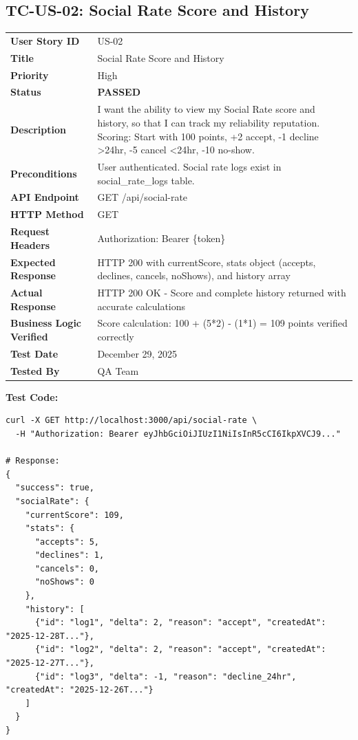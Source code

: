 \documentclass[11pt,a4paper]{article}
\newcommand{\passed}{\textcolor{pass}{\textbf{PASSED}}}
\begin{document}
\vspace{0.5cm}


\subsection{TC-US-02: Social Rate Score and History}

\begin{tabularx}{\textwidth}{|p{3.2cm}|Y|}
\hline
{}
 \\
\hline
\textbf{User Story ID} & US-02 \\
\hline
\textbf{Title} & Social Rate Score and History \\
\hline
\textbf{Priority} & High \\
\hline
\textbf{Status} & \passed \\
\hline
\textbf{Description} & I want the ability to view my Social Rate score and history, so that I can track my reliability reputation. Scoring: Start with 100 points, +2 accept, -1 decline >24hr, -5 cancel <24hr, -10 no-show. \\
\hline
\textbf{Preconditions} & User authenticated. Social rate logs exist in social\_rate\_logs table. \\
\hline
\textbf{API Endpoint} & GET /api/social-rate \\
\hline
\textbf{HTTP Method} & GET \\
\hline
\textbf{Request Headers} & Authorization: Bearer \{token\} \\
\hline
\textbf{Expected Response} & HTTP 200 with currentScore, stats object (accepts, declines, cancels, noShows), and history array \\
\hline
\textbf{Actual Response} & HTTP 200 OK - Score and complete history returned with accurate calculations \\
\hline
\textbf{Business Logic Verified} & Score calculation: 100 + (5*2) - (1*1) = 109 points verified correctly \\
\hline
\textbf{Test Date} & December 29, 2025 \\
\hline
\textbf{Tested By} & QA Team \\
\hline
\end{tabularx}

\vspace{0.3cm}
\textbf{Test Code:}
\begin{lstlisting}
curl -X GET http://localhost:3000/api/social-rate \
  -H "Authorization: Bearer eyJhbGciOiJIUzI1NiIsInR5cCI6IkpXVCJ9..."

# Response:
{
  "success": true,
  "socialRate": {
    "currentScore": 109,
    "stats": {
      "accepts": 5,
      "declines": 1,
      "cancels": 0,
      "noShows": 0
    },
    "history": [
      {"id": "log1", "delta": 2, "reason": "accept", "createdAt": "2025-12-28T..."},
      {"id": "log2", "delta": 2, "reason": "accept", "createdAt": "2025-12-27T..."},
      {"id": "log3", "delta": -1, "reason": "decline_24hr", "createdAt": "2025-12-26T..."}
    ]
  }
}
\end{lstlisting}
\end{document}
